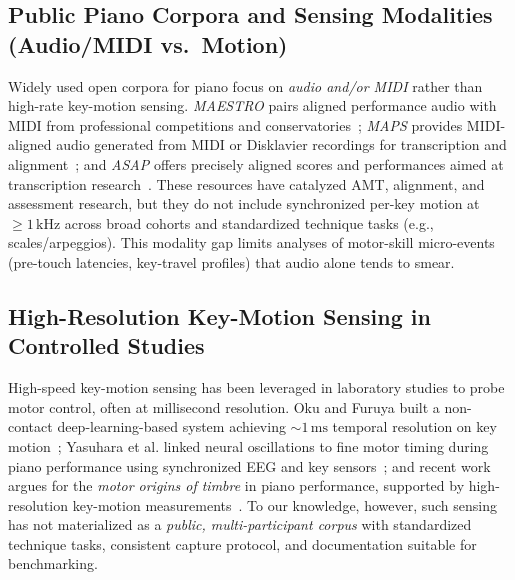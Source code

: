 \documentclass[sigconf,review,anonymous]{acmart}
\makeatletter
\newcommand{\etal}{et al.\@\xspace} %
\makeatother
\begin{document}
\subsection{Public Piano Corpora and Sensing Modalities (Audio/MIDI vs.\ Motion)}
Widely used open corpora for piano focus on \emph{audio and/or MIDI} rather than high-rate key-motion sensing. \emph{MAESTRO} pairs aligned performance audio with MIDI from professional competitions and conservatories~\cite{Hawthorne2019MAESTRO}; \emph{MAPS} provides MIDI-aligned audio generated from MIDI or Disklavier recordings for transcription and alignment~\cite{Emiya2010MAPS}; and \emph{ASAP} offers precisely aligned scores and performances aimed at transcription research~\cite{Foscarin2020ASAP}. These resources have catalyzed AMT, alignment, and assessment research, but they do not include synchronized per-key motion at \(\geq 1\,\mathrm{kHz}\) across broad cohorts and standardized technique tasks (e.g., scales/arpeggios). This modality gap limits analyses of motor-skill micro-events (pre-touch latencies, key-travel profiles) that audio alone tends to smear.

\subsection{High-Resolution Key-Motion Sensing in Controlled Studies}
High-speed key-motion sensing has been leveraged in laboratory studies to probe motor control, often at millisecond resolution. Oku and Furuya built a non-contact deep-learning-based system achieving \(\sim1\,\mathrm{ms}\) temporal resolution on key motion~\cite{Oku2022Sensors}; Yasuhara \etal linked neural oscillations to fine motor timing during piano performance using synchronized EEG and key sensors~\cite{Yasuhara2024iScience}; and recent work argues for the \emph{motor origins of timbre} in piano performance, supported by high-resolution key-motion measurements~\cite{Kuromiya2025PNAS}. To our knowledge, however, such sensing has not materialized as a \emph{public, multi-participant corpus} with standardized technique tasks, consistent capture protocol, and documentation suitable for benchmarking.
\end{document}
